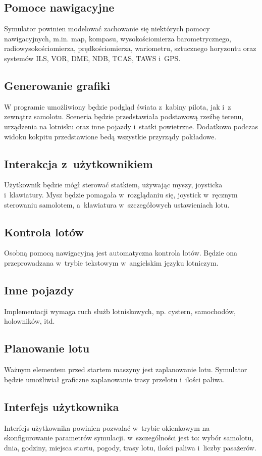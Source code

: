\documentclass{mwrep}
\begin{document}
\subsection{Pomoce nawigacyjne}
Symulator powinien modelować zachowanie się niektórych pomocy nawigacyjnych, m.in. map, kompasu, wysokościomierza barometrycznego, radiowysokościomierza, prędkościomierza, wariometru, sztucznego horyzontu oraz systemów ILS, VOR, DME, NDB, TCAS, TAWS i~GPS.

\subsection{Generowanie grafiki}
W programie umożliwiony będzie podgląd świata z~kabiny pilota, jak i~z zewnątrz samolotu. Sceneria będzie przedstawiała podstawową rzeźbę terenu, urządzenia na lotnisku oraz inne pojazdy i~statki powietrzne. Dodatkowo podczas widoku kokpitu przedstawione bedą wszystkie przyrządy pokładowe.

\subsection{Interakcja z~użytkownikiem}
Użytkownik będzie mógł sterować statkiem, używając myszy, joysticka i~klawiatury. Mysz będzie pomagała w~rozglądaniu się, joystick w~ręcznym sterowaniu samolotem, a~klawiatura w~szczegółowych ustawieniach lotu.

\subsection{Kontrola lotów}
Osobną pomocą nawigacyjną jest automatyczna kontrola lotów. Będzie ona przeprowadzana w~trybie tekstowym w~angielskim języku lotniczym.

\subsection{Inne pojazdy}
Implementacji wymaga ruch służb lotniskowych, np. cystern, samochodów, holowników, itd.

\subsection{Planowanie lotu}
Ważnym elementem przed startem maszyny jest zaplanowanie lotu. Symulator będzie umożliwiał graficzne zaplanowanie trasy przelotu i~ilości paliwa.

\subsection{Interfejs użytkownika}
Interfejs użytkownika powinien pozwalać w~trybie okienkowym na skonfigurowanie parametrów symulacji. w~szczególności jest to: wybór samolotu, dnia, godziny, miejsca startu, pogody, trasy lotu, ilości paliwa i~liczby pasażerów.
\end{document}
